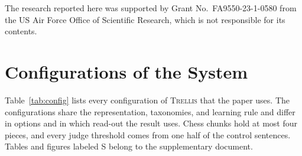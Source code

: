 \documentclass[11pt,letterpaper]{article}
\newcommand{\trellis}{\textsc{Trellis}}
\begin{document}
\begin{acknowledgements}
\noindent
The research reported here was supported by Grant No.\ FA9550-23-1-0580 from the US Air Force Office of Scientific Research, which is not responsible for its contents.
\end{acknowledgements}

{\footnotesize\parindent -10pt\leftskip 10pt\noindent


}

\appendix


\section{Configurations of the System}

Table~\ref{tab:config} lists every configuration of \trellis{} that the paper uses. The configurations share the representation, taxonomies, and learning rule and differ in options and in which read-out the result uses.
Chess chunks hold at most four pieces, and every judge threshold comes from one half of the control sentences. Tables and figures labeled S belong to the supplementary document.
\end{document}
